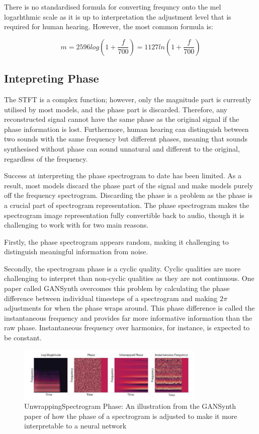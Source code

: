 There is no standardised formula for converting frequncy onto the mel logarhthmic scale as it is up to interpretation the adjustment level that is required for human hearing. However, the most common formula is\cite{SpeechCommunication}:

\begin{equation}
    m = 2596 log(1 +  \frac{f}{700}) = 1127 ln (1 + \frac{f}{700})
\end{equation}

\subsection{Intepreting Phase}

The STFT is a complex function; however, only the magnitude part is currently utilised by most models, and the phase part is discarded. Therefore, any reconstructed signal cannot have the same phase as the original signal if the phase information is lost. Furthermore, human hearing can distinguish between two sounds with the same frequency but different phases, meaning that sounds synthesised without phase can sound unnatural and different to the original, regardless of the frequency.

Success at interpreting the phase spectrogram to date has been limited. As a result, most models discard the phase part of the signal and make models purely off the frequency spectrogram. Discarding the phase is a problem as the phase is a crucial part of spectrogram representation. The phase spectrogram makes the spectrogram image representation fully convertible back to audio, though it is challenging to work with for two main reasons.

Firstly, the phase spectrogram appears random, making it challenging to distinguish meaningful information from noise.

Secondly, the spectrogram phase is a cyclic quality. Cyclic qualities are more challenging to interpret than non-cyclic qualities as they are not continuous. One paper called GANSynth\cite{GANSynth} overcomes this problem by calculating the phase difference between individual timesteps of a spectrogram and making $2\pi$  adjustments for when the phase wraps around. This phase difference is called the instantaneous frequency and provides far more informative information than the raw phase. Instantaneous frequency over harmonics, for instance, is expected to be constant.

\begin{figure}[H]
    \centering
    \includegraphics[width=0.8\textwidth]{literature_review/PhaseAdjustment.png}
    \caption{UnwrappingSpectrogram Phase: An illustration from the GANSynth paper of how the phase of a spectrogram is adjusted to make it more interpretable to a neural network\cite{GANSynth}}
    \label{fig:phase_unwrapping}
\end{figure}

